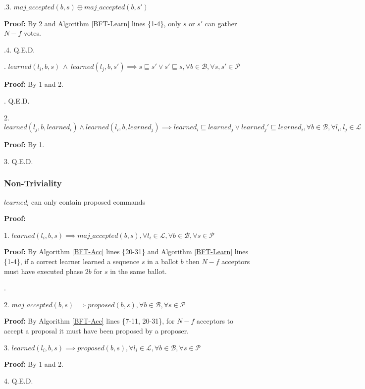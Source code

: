 \indent\indent\indent\indent{}.3. $maj\_accepted(b,s) \oplus maj\_accepted(b,s')$ \par
\indent\indent\indent\indent\indent\indent \parbox{\linewidth}{\textbf{Proof:} By 2 and Algorithm \ref{BFT-Learn} lines \{1-4\}, only $s$ or $s'$ can gather $N-f$ votes.}\par
\indent\indent\indent\indent{}.4. Q.E.D. \par
\indent\indent{}. $learned(l_i,b,s)\ \land\ learned(l_j,b,s') \implies s \sqsubseteq s' \lor s' \sqsubseteq s, \forall b \in \mathcal{B}, \forall s,s' \in \mathcal{P}$ \par
\indent\indent\indent\indent\textbf{Proof:} By 1 and 2.\par
\indent\indent{}. Q.E.D. \par
\parbox{\linewidth}{2. $learned(l_j,b,learned_i) \land learned(l_i,b,learned_j) \implies learned_i \sqsubseteq learned_j \lor learned_j' \sqsubseteq learned_i, \forall b \in \mathcal{B}, \forall l_i,l_j \in \mathcal{L}$}\par
\indent\indent\textbf{Proof:} By 1.\par
3. Q.E.D. \par

\subsubsection{Non-Triviality}
\begin{theorem}
$learned_l$ can only contain proposed commands \label{N-T1} \par
\end{theorem} 
\textbf{Proof:} \par
1. $learned(l_i,b,s) \implies maj\_accepted(b,s),\forall l_i \in \mathcal{L}, \forall b \in \mathcal{B}, \forall s \in \mathcal{P}$ \par
\indent\indent\parbox{\linewidth}{\textbf{Proof:} By Algorithm \ref{BFT-Acc} lines \{20-31\} and Algorithm \ref{BFT-Learn} lines \{1-4\}, if a correct learner learned a sequence $s$ in a ballot $b$ then $N-f$ acceptors must have executed phase $2b$ for $s$ in the same ballot.}. \par
2. $maj\_accepted(b,s) \implies proposed(b,s),\forall b \in \mathcal{B}, \forall s \in \mathcal{P}$ \par
\indent\indent\textbf{Proof:} By Algorithm \ref{BFT-Acc} lines \{7-11, 20-31\}, for $N-f$ acceptors to accept a proposal it must have been proposed by a proposer.\par
3. $learned(l_i,b,s) \implies proposed(b,s),\forall l_i \in \mathcal{L}, \forall b \in \mathcal{B}, \forall s \in \mathcal{P}$ \par
\indent\indent\textbf{Proof:} By 1 and 2. \par
4. Q.E.D. \par

